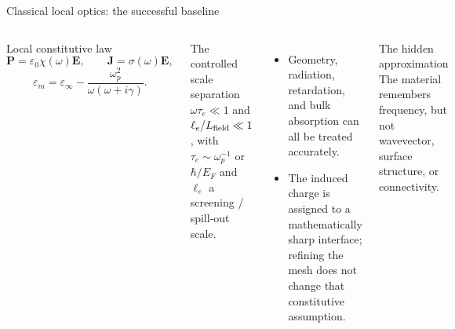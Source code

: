 \documentclass[aspectratio=169,10pt]{beamer}
\begin{document}
\begin{frame}{Classical local optics: the successful baseline}
\footnotesize
\begin{columns}[T,onlytextwidth]
  \begin{block}{Local constitutive law}
    \[
      \mathbf P=\varepsilon_0\chi(\omega)\mathbf E,\qquad
      \mathbf J=\sigma(\omega)\mathbf E,
    \]
    \[
      \varepsilon_m=\varepsilon_\infty-\frac{\omega_p^2}{\omega(\omega+i\gamma)}.
    \]
  \end{block}
  \begin{block}{The controlled scale separation}
    $\omega\tau_e\ll1$ and $\ell_e/L_{\rm field}\ll1$, with
    $\tau_e\sim\omega_p^{-1}$ or $\hbar/E_F$ and $\ell_e$ a screening / spill-out scale.
  \end{block}
  \begin{itemize}
    \item Geometry, radiation, retardation, and bulk absorption can all be treated accurately.
    \item The induced charge is assigned to a mathematically sharp interface; refining the mesh does not change that constitutive assumption.
  \end{itemize}
  \centering
  \begin{alertblock}{The hidden approximation}
    The material remembers frequency, but not wavevector, surface structure, or connectivity.
  \end{alertblock}
\end{columns}
\vspace{-0.15em}
\end{frame}
\end{document}
